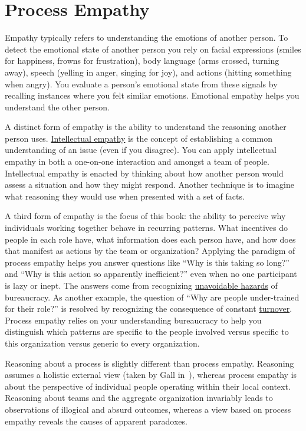 \section{Process Empathy\label{sec:process-empathy}}

Empathy typically refers to understanding the emotions of another person. To detect the emotional state of another person you rely on facial expressions (smiles for happiness, frowns for frustration), body language (arms crossed, turning away), speech (yelling in anger, singing for joy), and actions (hitting something when angry). You evaluate a person's emotional state from these signals by recalling instances where you felt similar emotions. Emotional empathy helps you understand the other person. 

A distinct form of empathy is the ability to understand the reasoning another person uses.  
\hyperref[sec:intellectual-empathy]{Intellectual empathy} is the concept of establishing a common understanding of an issue (even if you disagree). You can apply intellectual empathy in both a one-on-one interaction and amongst a team of people. Intellectual empathy is enacted by thinking about how another person would assess a situation and how they might respond. Another technique is to imagine what reasoning they would use when presented with a set of facts. 


A third form of empathy is the focus of this book: the ability to perceive why individuals working together behave in recurring patterns. What incentives do people in each role have, what information does each person have, and how does that manifest as actions by the team or organization? Applying the paradigm of \gls{process empathy} helps you answer questions like ``Why is this taking so long?'' and ``Why is this action so apparently inefficient?'' even when no one participant is lazy or inept. The answers come from recognizing \hyperref[sec:unavoidable-hazards]{unavoidable hazards} of bureaucracy. As another example, the question of ``Why are people under-trained for their role?'' is resolved by recognizing the consequence of  constant \hyperref[sec:turnover]{turnover}. Process empathy relies on your understanding bureaucracy to help you distinguish which patterns are specific to the people involved versus specific to this organization versus generic to every organization.

Reasoning about a process is slightly different than process empathy. Reasoning assumes a holistic external view (taken by Gall in~\cite{2002_Gall}), whereas process empathy is about the perspective of individual people operating within their local context. Reasoning about teams and the aggregate organization invariably leads to observations of illogical and absurd outcomes, whereas a view based on process empathy reveals the causes of apparent paradoxes.


